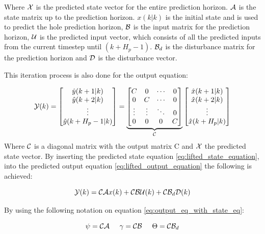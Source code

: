 Where $\CMcal{X}$ is the predicted state vector for the entire prediction horizon. $\CMcal{A}$ is the state matrix up to the prediction horizon. $x(k|k)$ is the initial state and is used to predict the hole prediction horizon, $\CMcal{B}$ is the input matrix for the prediction horizon, $\CMcal{U}$ is the predicted input vector, which consists of all the predicted inputs from the current timestep until $(k+H_p-1)$. $\CMcal{B}_d$ is the disturbance matrix for the prediction horizon and $\CMcal{D}$ is the disturbance vector. 

This iteration process is also done for the output equation:

\begin{equation}\label{eq:lifted_output_equation}
	\CMcal{Y}(k)= 
	\begin{bmatrix}
	\hat{y}(k+1|k)\\
	\hat{y}(k+2|k)\\
	\vdots\\
	\hat{y}(k+H_p-1|k)
	\end{bmatrix}
	= 
	\underbrace{\begin{bmatrix}
	C 		& 0 	&\cdots	& 0\\
	0 		& C 	&\cdots & 0 \\
	\vdots	& \vdots&\ddots & 0\\
	0 		& 0		&0 		& C
	\end{bmatrix}}_{\CMcal{C}}
	  \begin{bmatrix}
	  \hat{x}(k+1|k) 	\\
	  \hat{x}(k+2|k) 	\\
	  \vdots 			\\
	  \hat{x}(k+H_p|k) 	\\
	   \end{bmatrix}
\end{equation}
Where $\CMcal{C}$ is a diagonal matrix with the output matrix C and $\CMcal{X}$ the predicted state vector. By inserting the predicted state equation \ref{eq:lifted_state_equation}, into the predicted output equation \ref{eq:lifted_output_equation} the following is achieved:

\begin{equation}\label{eq:output_eq_with_state_eq}
	\CMcal{Y}(k) =  \CMcal{C}\CMcal{A}x(k) +  \CMcal{C}\CMcal{B}\CMcal{U}(k) +\CMcal{C}\CMcal{B}_d\CMcal{D}(k)
\end{equation}   

By using the following notation on equation \ref{eq:output_eq_with_state_eq}:


\begin{equation}
 \psi = \CMcal{C}\CMcal{A}  \hspace{5mm} \gamma = \CMcal{C}\CMcal{B} \hspace{5mm}  \Theta = \CMcal{C}\CMcal{B}_{d}
\end{equation}

